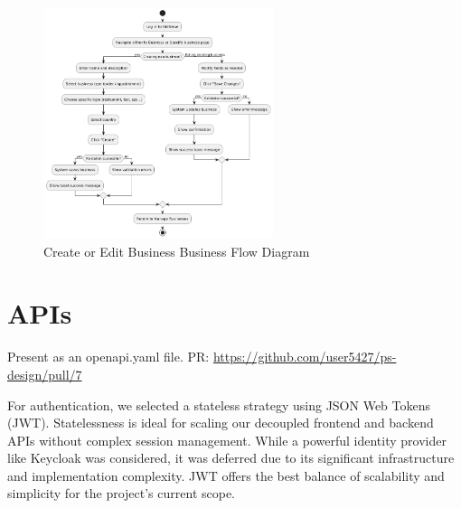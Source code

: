 \documentclass[]{VUMIFTemplateClass}
\newcommand{\todocomment}[1]{%
    \begin{tcolorbox}[colback=red!20, colframe=red!60, arc=0pt, outer arc=0pt, boxrule=1pt, left=3pt, right=3pt, top=3pt, bottom=3pt]
        \textbf{\textcolor{orange!70!black}{TODO:}} #1
    \end{tcolorbox}
}
\begin{document}
\begin{figure}[H]
    \centering
    \includegraphics[width=0.6\textwidth]{docs/ps-design/design-document/images/diagrams/business/bpmn_manage_business_information.png}
    \caption{Create or Edit Business Business Flow Diagram}
    \label{fig:manage_businesses_flow}
\end{figure}



\section{APIs}

Present as an openapi.yaml file. PR: \url{https://github.com/user5427/ps-design/pull/7}



For authentication, we selected a stateless strategy using JSON Web Tokens (JWT). Statelessness is ideal for scaling our decoupled frontend and backend APIs without complex session management. While a powerful identity provider like Keycloak was considered, it was deferred due to its significant infrastructure and implementation complexity. JWT offers the best balance of scalability and simplicity for the project's current scope.




\end{document}
